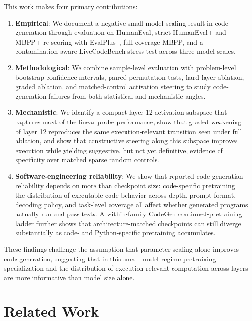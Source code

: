 \documentclass[preprint,12pt,authoryear]{elsarticle}
\begin{document}
This work makes four primary contributions:

\begin{enumerate}
\item \textbf{Empirical}: We document a negative small-model scaling result in code generation through evaluation on HumanEval, strict HumanEval+ and MBPP+ re-scoring with EvalPlus~\cite{liu2023evalplus}, full-coverage MBPP, and a contamination-aware LiveCodeBench stress test across three model scales.

\item \textbf{Methodological}: We combine sample-level evaluation with problem-level bootstrap confidence intervals, paired permutation tests, hard layer ablation, graded ablation, and matched-control activation steering to study code-generation failures from both statistical and mechanistic angles.

\item \textbf{Mechanistic}: We identify a compact layer-12 activation subspace that captures most of the linear probe performance, show that graded weakening of layer 12 reproduces the same execution-relevant transition seen under full ablation, and show that constructive steering along this subspace improves execution while yielding suggestive, but not yet definitive, evidence of specificity over matched sparse random controls.

\item \textbf{Software-engineering reliability}: We show that reported code-generation reliability depends on more than checkpoint size: code-specific pretraining, the distribution of executable-code behavior across depth, prompt format, decoding policy, and task-level coverage all affect whether generated programs actually run and pass tests. A within-family CodeGen continued-pretraining ladder further shows that architecture-matched checkpoints can still diverge substantially as code- and Python-specific pretraining accumulates.
\end{enumerate}

These findings challenge the assumption that parameter scaling alone improves code generation, suggesting that in this small-model regime pretraining specialization and the distribution of execution-relevant computation across layers are more informative than model size alone.

\section{Related Work}
\end{document}
